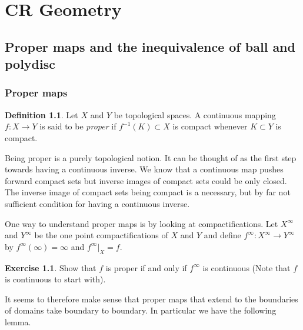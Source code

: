 \documentclass[12pt,openany]{book}
\theoremstyle{plain}
\theoremstyle{remark}
\theoremstyle{definition}
\newtheorem{defn}[thm]{Definition}
\theoremstyle{exercise}
\newtheorem{exercise}{Exercise}[section]
\theoremstyle{example}
\begin{document}

\chapter{CR Geometry} \label{cr:chapter}


\section{Proper maps and the inequivalence of ball and polydisc} \label{sec:ibp}

\subsection{Proper maps}

\begin{defn}
Let $X$ and $Y$ be topological spaces.  A continuous mapping
$f \colon X \to Y$ is said to be \emph{proper}
if $f^{-1}(K) \subset X$ is compact whenever $K \subset Y$ is compact.
\end{defn}

Being proper is a purely topological notion.  It can be thought of as the
first step towards having a continuous inverse.  We know that a continuous
map pushes forward compact sets but inverse images of compact sets could be
only closed.  The inverse image of compact sets being compact is a necessary,
but by far not sufficient condition for having a continuous inverse.

One way to understand proper maps is by looking at compactifications.
Let $X^\infty$ and $Y^\infty$ be the one
point compactifications of $X$ and $Y$ and define $f^\infty \colon X^\infty
\to Y^\infty$
by $f^\infty(\infty) = \infty$ and $f^\infty|_X = f$.

\begin{exercise}
Show that $f$ is proper if and only if $f^\infty$ is continuous (Note that $f$ is
continuous to start with).
\end{exercise}

It seems to therefore make sense that
proper maps that extend to the boundaries of domains 
take boundary to boundary.  In particular we have the following lemma.
\end{document}

